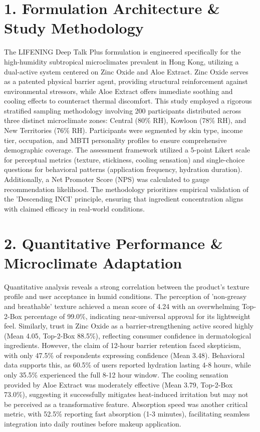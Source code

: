 \documentclass[10pt,twocolumn,a4paper]{article}
\begin{document}
\section{1. Formulation Architecture \& Study Methodology}
The LIFENING Deep Talk Plus formulation is engineered specifically for the high-humidity subtropical microclimates prevalent in Hong Kong, utilizing a dual-active system centered on Zinc Oxide and Aloe Extract. Zinc Oxide serves as a patented physical barrier agent, providing structural reinforcement against environmental stressors, while Aloe Extract offers immediate soothing and cooling effects to counteract thermal discomfort. This study employed a rigorous stratified sampling methodology involving 200 participants distributed across three distinct microclimate zones: Central (80\% RH), Kowloon (78\% RH), and New Territories (76\% RH). Participants were segmented by skin type, income tier, occupation, and MBTI personality profiles to ensure comprehensive demographic coverage. The assessment framework utilized a 5-point Likert scale for perceptual metrics (texture, stickiness, cooling sensation) and single-choice questions for behavioral patterns (application frequency, hydration duration). Additionally, a Net Promoter Score (NPS) was calculated to gauge recommendation likelihood. The methodology prioritizes empirical validation of the 'Descending INCI' principle, ensuring that ingredient concentration aligns with claimed efficacy in real-world conditions.
\section{2. Quantitative Performance \& Microclimate Adaptation}
Quantitative analysis reveals a strong correlation between the product’s texture profile and user acceptance in humid conditions. The perception of 'non-greasy and breathable' texture achieved a mean score of 4.24 with an overwhelming Top-2-Box percentage of 99.0\%, indicating near-universal approval for its lightweight feel. Similarly, trust in Zinc Oxide as a barrier-strengthening active scored highly (Mean 4.05, Top-2-Box 88.5\%), reflecting consumer confidence in dermatological ingredients. However, the claim of 12-hour barrier retention faced skepticism, with only 47.5\% of respondents expressing confidence (Mean 3.48). Behavioral data supports this, as 60.5\% of users reported hydration lasting 4-8 hours, while only 35.5\% experienced the full 8-12 hour window. The cooling sensation provided by Aloe Extract was moderately effective (Mean 3.79, Top-2-Box 73.0\%), suggesting it successfully mitigates heat-induced irritation but may not be perceived as a transformative feature. Absorption speed was another critical metric, with 52.5\% reporting fast absorption (1-3 minutes), facilitating seamless integration into daily routines before makeup application.
\end{document}
